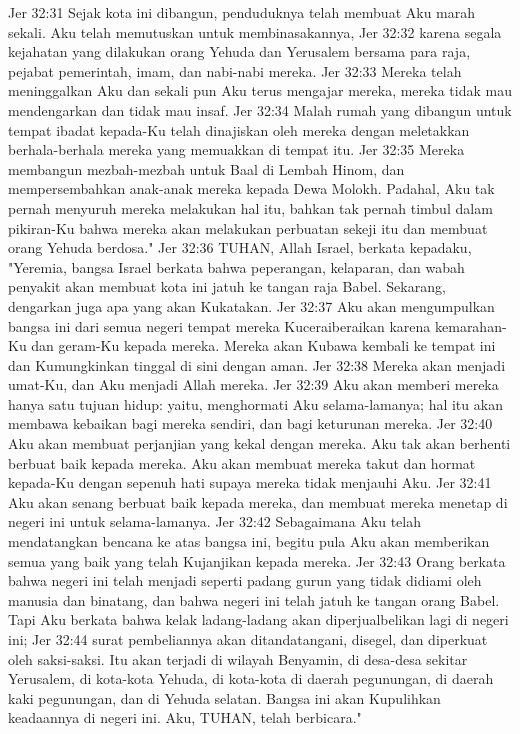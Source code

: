 Jer 32:31  Sejak kota ini dibangun, penduduknya telah membuat Aku marah sekali. Aku telah memutuskan untuk membinasakannya,
Jer 32:32  karena segala kejahatan yang dilakukan orang Yehuda dan Yerusalem bersama para raja, pejabat pemerintah, imam, dan nabi-nabi mereka.
Jer 32:33  Mereka telah meninggalkan Aku dan sekali pun Aku terus mengajar mereka, mereka tidak mau mendengarkan dan tidak mau insaf.
Jer 32:34  Malah rumah yang dibangun untuk tempat ibadat kepada-Ku telah dinajiskan oleh mereka dengan meletakkan berhala-berhala mereka yang memuakkan di tempat itu.
Jer 32:35  Mereka membangun mezbah-mezbah untuk Baal di Lembah Hinom, dan mempersembahkan anak-anak mereka kepada Dewa Molokh. Padahal, Aku tak pernah menyuruh mereka melakukan hal itu, bahkan tak pernah timbul dalam pikiran-Ku bahwa mereka akan melakukan perbuatan sekeji itu dan membuat orang Yehuda berdosa."
Jer 32:36  TUHAN, Allah Israel, berkata kepadaku, "Yeremia, bangsa Israel berkata bahwa peperangan, kelaparan, dan wabah penyakit akan membuat kota ini jatuh ke tangan raja Babel. Sekarang, dengarkan juga apa yang akan Kukatakan.
Jer 32:37  Aku akan mengumpulkan bangsa ini dari semua negeri tempat mereka Kuceraiberaikan karena kemarahan-Ku dan geram-Ku kepada mereka. Mereka akan Kubawa kembali ke tempat ini dan Kumungkinkan tinggal di sini dengan aman.
Jer 32:38  Mereka akan menjadi umat-Ku, dan Aku menjadi Allah mereka.
Jer 32:39  Aku akan memberi mereka hanya satu tujuan hidup: yaitu, menghormati Aku selama-lamanya; hal itu akan membawa kebaikan bagi mereka sendiri, dan bagi keturunan mereka.
Jer 32:40  Aku akan membuat perjanjian yang kekal dengan mereka. Aku tak akan berhenti berbuat baik kepada mereka. Aku akan membuat mereka takut dan hormat kepada-Ku dengan sepenuh hati supaya mereka tidak menjauhi Aku.
Jer 32:41  Aku akan senang berbuat baik kepada mereka, dan membuat mereka menetap di negeri ini untuk selama-lamanya.
Jer 32:42  Sebagaimana Aku telah mendatangkan bencana ke atas bangsa ini, begitu pula Aku akan memberikan semua yang baik yang telah Kujanjikan kepada mereka.
Jer 32:43  Orang berkata bahwa negeri ini telah menjadi seperti padang gurun yang tidak didiami oleh manusia dan binatang, dan bahwa negeri ini telah jatuh ke tangan orang Babel. Tapi Aku berkata bahwa kelak ladang-ladang akan diperjualbelikan lagi di negeri ini;
Jer 32:44  surat pembeliannya akan ditandatangani, disegel, dan diperkuat oleh saksi-saksi. Itu akan terjadi di wilayah Benyamin, di desa-desa sekitar Yerusalem, di kota-kota Yehuda, di kota-kota di daerah pegunungan, di daerah kaki pegunungan, dan di Yehuda selatan. Bangsa ini akan Kupulihkan keadaannya di negeri ini. Aku, TUHAN, telah berbicara."
